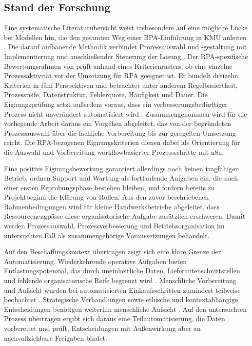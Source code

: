 \documentclass[a4paper,12pt]{article}
\begin{document}
\subsection{Stand der Forschung}
Eine systematische Literaturübersicht weist insbesondere auf eine mögliche Lücke bei Modellen hin, die den gesamten Weg einer BPA-Einführung in KMU anleiten \parencite{moreira_business_2024}. Die darauf aufbauende Methodik verbindet Prozessauswahl und -gestaltung mit Implementierung und anschließender Steuerung der Lösung \parencite{moreira_methodology_2025}. Der RPA-spezifische Bewertungsrahmen von \textcite{wellmann_framework_2020} prüft anhand eines Kriterienrasters, ob eine einzelne Prozessaktivität vor der Umsetzung für RPA geeignet ist. Er bündelt dreizehn Kriterien in fünf Perspektiven und betrachtet unter anderem Regelbasiertheit, Prozessreife, Datenstruktur, Fehlerquote, Häufigkeit und Dauer. Die Eignungsprüfung setzt außerdem voraus, dass ein verbesserungsbedürftiger Prozess nicht unverändert automatisiert wird \parencite{stravinskiene_process_2021}. Zusammengenommen wird für die vorliegende Arbeit daraus ein Vorgehen abgeleitet, das von der begründeten Prozessauswahl über die fachliche Vorbereitung bis zur geregelten Umsetzung reicht. Die RPA-bezogenen Eignungskriterien dienen dabei als Orientierung für die Auswahl und Vorbereitung workflowbasierter Prozessschritte mit n8n.

Eine positive Eignungsbewertung garantiert allerdings noch keinen tragfähigen Betrieb. \Textcite{herm_framework_2023} ordnen Support und Wartung als fortlaufende Aufgaben ein, die nach einer ersten Erprobungsphase bestehen bleiben, und fordern bereits zu Projektbeginn die Klärung von Rollen. Aus den zuvor beschriebenen Rahmenbedingungen wird für kleine Handwerksbetriebe abgeleitet, dass Ressourcenengpässe diese organisatorische Aufgabe zusätzlich erschweren. Damit werden Prozessauswahl, Prozessverbesserung und Betriebsorganisation im untersuchten Fall als zusammengehörige Voraussetzungen behandelt.

Auf den Beschaffungskontext übertragen zeigt sich eine klare Grenze der Automatisierung. Wiederkehrende operative Aufgaben bieten Entlastungspotenzial, das durch uneinheitliche Daten, Lieferantenschnittstellen und fehlende organisatorische Reife begrenzt wird \parencite{flechsig_robotic_2022}. Menschliche Vorbereitung und Aufsicht wurden bei automatisierten Einkaufsschritten zumindest teilweise beobachtet \parencite{viale_impact_2020}. Strategische Verhandlungen sowie ethische und kontextabhängige Entscheidungen benötigen weiterhin menschliche Aufsicht \parencite{santos_rebooting_2025}. Auf den untersuchten Prozess übertragen ergibt sich daraus eine Teilautomatisierung, die Daten vorbereitet und prüft, Entscheidungen mit Außenwirkung aber an nachvollziehbare Freigaben bindet.
\end{document}
